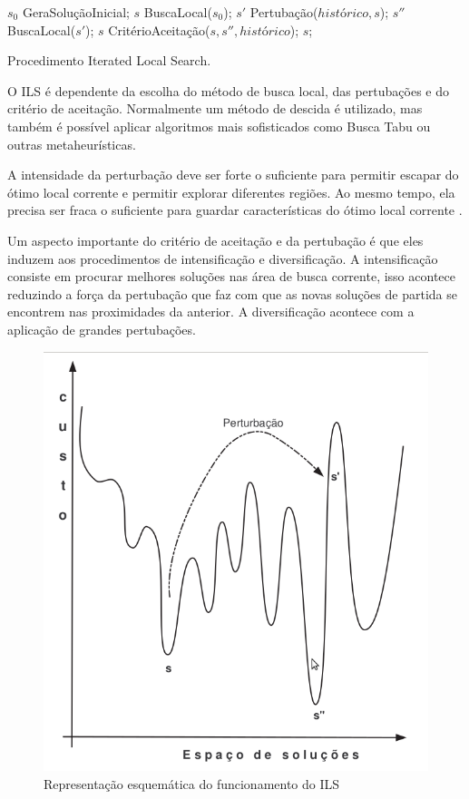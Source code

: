 \begin{pgrm}[h]
\begin{programma}
\STATE $s_{0}$ \GETS GeraSoluçãoInicial;
\STATE $s$ \GETS BuscaLocal($s_{0}$);
\STATE $s{'}$ \GETS Pertubação($histórico, s$);
\STATE $s{''}$ \GETS BuscaLocal($s{'}$);
\STATE $s$ \GETS CritérioAceitação($s, s{''}, histórico$);
\ENDWHILE
\STATE\RETURN $s$;
\ENDALGORITHM
\end{programma}
\caption{Procedimento Iterated Local Search.}\label{alg:ils}
\end{pgrm}

O ILS é dependente da escolha do método de busca local, das pertubações e do critério de aceitação. Normalmente um método de descida é utilizado, mas também é possível aplicar algoritmos mais sofisticados como Busca Tabu ou outras metaheurísticas.

A intensidade da perturbação deve ser forte o suficiente para permitir escapar do ótimo
local corrente e permitir explorar diferentes regiões. Ao mesmo tempo, ela precisa ser fraca
o suficiente para guardar características do ótimo local corrente \cite{notasmarcone}.

Um aspecto importante do critério de aceitação e da pertubação é que eles induzem aos procedimentos de intensificação e diversificação. A intensificação consiste em procurar melhores soluções nas área de busca corrente, isso acontece reduzindo a força da pertubação que faz com que as novas soluções de partida se encontrem nas proximidades da anterior. A diversificação acontece com a aplicação de grandes pertubações.

\begin{figure}[ht]
	\centering
	\includegraphics[scale=0.3]{./img/ilsfuncionamento.png}
	\caption{Representação esquemática do funcionamento do ILS}
	\label{img:ilsfuncionamento}
\end{figure}

